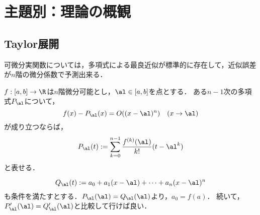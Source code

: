 \documentclass[uplatex,dvipdfmx]{jsarticle}
\begin{document}
\section{主題別：理論の概観}

\subsection{Taylor展開}

\begin{tcolorbox}[colframe=ForestGreen, colback=ForestGreen!10!white,breakable,colbacktitle=ForestGreen!40!white,coltitle=black,fonttitle=\bfseries\sffamily,
    title=]
    可微分実関数については，多項式による最良近似が標準的に存在して，近似誤差が$n$階の微分係数で予測出来る．
\end{tcolorbox}

\begin{lemma}[可微分関数の多項式近似]
    $f:[a,b]\to\R$は$n$階微分可能とし，$\al\in[a,b]$を点とする．
    ある$n-1$次の多項式$P_\al$について，
    \[f(x)-P_\al(x)=O((x-\al)^n)\quad(x\to\al)\]
    が成り立つならば，
    \[P_\al(t):=\sum^{n-1}_{k=0}\frac{f^{(k)}(\al)}{k!}(t-\al^k)\]
    と表せる．
\end{lemma}
\begin{Proof}
    \[Q_\al(t):=a_0+a_1(x-\al)+\cdots+a_n(x-\al)^n\]
    も条件を満たすとする．$P_\al(\al)=Q_\al(\al)$より，$a_0=f(a)$．
    続いて，$P'_\al(\al)=Q'_\al(\al)$と比較して行けば良い．
\end{Proof}
\end{document}
